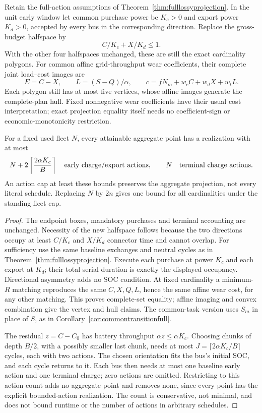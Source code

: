 \begin{corollary}
\label{cor:directionalwear}
Retain the full-action assumptions of
Theorem~\ref{thm:fulllossyprojection}. In the unit early window let common
purchase power be $K_c>0$ and export power $K_d>0$, accepted by every
bus in the corresponding direction. Replace the gross-budget halfspace by
\[
 C/K_c+X/K_d\le1.
\]
With the other four halfspaces unchanged, these are still the exact
cardinality polygons. For common affine grid-throughput wear coefficients,
their complete joint load--cost images are
\[
 E=C-X,\qquad L=(S-Q)/\alpha,\qquad
 c=fN_m+w_cC+w_dX+w_tL.
\]
Each polygon still has at most five vertices, whose affine images generate
the complete-plan hull. Fixed nonnegative wear coefficients have their
usual cost interpretation; exact projection equality itself needs no
coefficient-sign or economic-monotonicity restriction.

For a fixed used fleet $N$, every attainable aggregate point has a
realization with at most
\[
 N+2\left\lceil\frac{2\alpha K_c}{B}\right\rceil
 \quad\hbox{early charge/export actions},\qquad
 N\quad\hbox{terminal charge actions}.
\]
An action cap at least these bounds preserves the aggregate projection,
not every literal schedule. Replacing $N$ by $2n$ gives one bound for
all cardinalities under the standing fleet cap.
\end{corollary}

\begin{proof}
The endpoint boxes, mandatory purchases and terminal accounting are
unchanged. Necessity of the new halfspace follows because the two
directions occupy at least $C/K_c$ and $X/K_d$ connector time and cannot
overlap. For sufficiency use the same baseline exchanges and neutral
cycles as in Theorem~\ref{thm:fulllossyprojection}. Execute each purchase
at power $K_c$ and each export at $K_d$; their total serial duration is
exactly the displayed occupancy. Directional asymmetry adds no SOC
condition. At fixed cardinality a minimum-$R$ matching reproduces the
same $C,X,Q,L$, hence the same affine wear cost, for any other matching.
This proves complete-set equality; affine imaging and convex combination
give the vertex and hull claims. The common-task version uses $S_m$
in place of $S$, as in Corollary~\ref{cor:commontransitionfull}.

The residual $z=C-C_0$ has battery throughput $\alpha z\le\alpha K_c$.
Choosing chunks of depth $B/2$, with a possibly smaller last chunk, needs at most
$J=\lceil2\alpha K_c/B\rceil$ cycles, each with two actions. The chosen
orientation fits the bus's initial SOC, and each cycle returns to it.
Each bus then needs at most one baseline early action and one terminal
charge; zero actions are omitted. Restricting to this action count adds
no aggregate point and removes none, since every point has the explicit
bounded-action realization. The count is conservative, not minimal,
and does not bound runtime or the number of actions in arbitrary schedules.
\end{proof}

